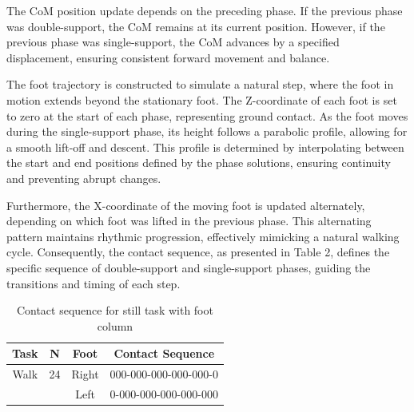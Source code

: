 \documentclass[main.tex]{subfiles}
\begin{document}
The CoM position update depends on the preceding phase. If the previous phase was double-support, the CoM remains at its current position. However, if the previous phase was single-support, the CoM advances by a specified displacement, ensuring consistent forward movement and balance.

The foot trajectory is constructed to simulate a natural step, where the foot in motion extends beyond the stationary foot. The Z-coordinate of each foot is set to zero at the start of each phase, representing ground contact. As the foot moves during the single-support phase, its height follows a parabolic profile, allowing for a smooth lift-off and descent. This profile is determined by interpolating between the start and end positions defined by the phase solutions, ensuring continuity and preventing abrupt changes.

Furthermore, the X-coordinate of the moving foot is updated alternately, depending on which foot was lifted in the previous phase. This alternating pattern maintains rhythmic progression, effectively mimicking a natural walking cycle. Consequently, the contact sequence, as presented in Table 2, defines the specific sequence of double-support and single-support phases, guiding the transitions and timing of each step.

\begin{table}[h!]
    \label{tab:stilltask}
    \centering
    \begin{tabular}{|c|c|c|c|}
        \hline
        Task & N & Foot & Contact Sequence \\
        \hline
        Walk & 24 & Right & 000-000-000-000-000-0 \\
        & & Left & 0-000-000-000-000-000 \\
        \hline
    \end{tabular}
    \caption{Contact sequence for still task with foot column}
\end{table}
\end{document}
